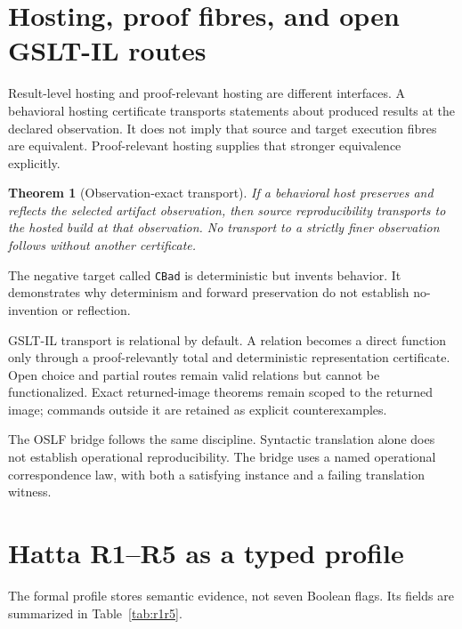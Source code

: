 \documentclass[11pt]{article}
\newtheorem{theorem}[definition]{Theorem}
\begin{document}
\section{Hosting, proof fibres, and open GSLT-IL routes}

Result-level hosting and proof-relevant hosting are different interfaces.  A
behavioral hosting certificate transports statements about produced results at
the declared observation.  It does not imply that source and target execution
fibres are equivalent.  Proof-relevant hosting supplies that stronger
equivalence explicitly.

\begin{theorem}[Observation-exact transport]
If a behavioral host preserves and reflects the selected artifact observation,
then source reproducibility transports to the hosted build at that observation.
No transport to a strictly finer observation follows without another
certificate.
\end{theorem}

The negative target called \texttt{CBad} is deterministic but invents behavior.
It demonstrates why determinism and forward preservation do not establish
no-invention or reflection.

GSLT-IL transport is relational by default.  A relation becomes a direct
function only through a proof-relevantly total and deterministic
representation certificate.  Open choice and partial routes remain valid
relations but cannot be functionalized.  Exact returned-image theorems remain
scoped to the returned image; commands outside it are retained as explicit
counterexamples.

The OSLF bridge follows the same discipline.  Syntactic translation alone does
not establish operational reproducibility.  The bridge uses a named
operational correspondence law, with both a satisfying instance and a failing
translation witness.

\section{Hatta R1--R5 as a typed profile}

The formal profile stores semantic evidence, not seven Boolean flags.  Its
fields are summarized in Table~\ref{tab:r1r5}.
\end{document}
